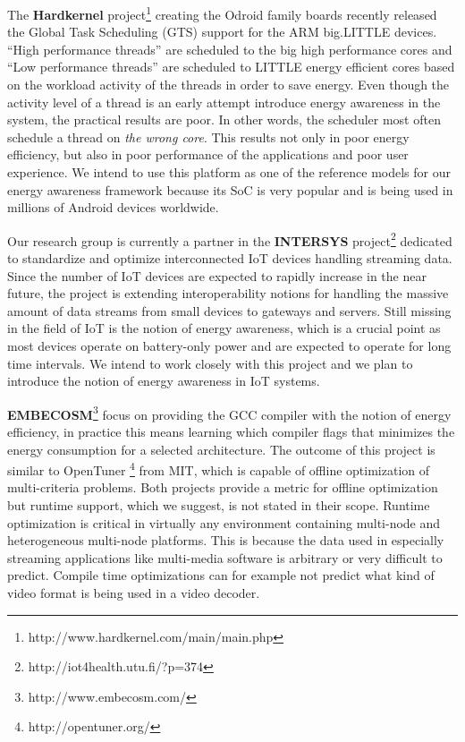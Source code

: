 \documentclass{article}
\begin{document}
The \textbf{Hardkernel} project\footnote{http://www.hardkernel.com/main/main.php} creating the Odroid family boards recently released the Global Task Scheduling (GTS) support for the ARM big.LITTLE devices. ``High performance threads'' are scheduled to the big high performance cores and ``Low performance threads'' are scheduled to LITTLE energy efficient cores based on the workload activity of the threads in order to save energy. 
Even though the activity level of a thread is an early attempt introduce energy awareness in the system, the practical results are poor. 
In other words, the scheduler most often schedule a thread on \textit{the wrong core}. 
This results not only in poor energy efficiency, but also in poor performance of the applications and poor user experience. 
We intend to use this platform as one of the reference models for our energy awareness framework because its SoC is very popular and is being used in millions of Android devices worldwide.\smallskip

Our research group is currently a partner in the \textbf{INTERSYS} project\footnote{http://iot4health.utu.fi/?p=374} dedicated to standardize and optimize interconnected IoT devices handling streaming data. Since the number of IoT devices are expected to rapidly increase in the near future, the project is extending interoperability notions for handling the massive amount of data streams from small devices to gateways and servers. 
Still missing in the field of IoT is the notion of energy awareness, which is a crucial point as most devices operate on battery-only power and are expected to operate for long time intervals. 
We intend to work closely with this project and we plan to introduce the notion of energy awareness in IoT systems.\smallskip

\textbf{EMBECOSM}\footnote{http://www.embecosm.com/} focus on providing the GCC compiler with the notion of energy efficiency, in practice this means learning which compiler flags that minimizes the energy consumption for a selected architecture. 
The outcome of this project is similar to OpenTuner \footnote{http://opentuner.org/} from MIT, which is capable of offline optimization of multi-criteria problems. 
Both projects provide a metric for offline optimization but runtime support, which we suggest, is not stated in their scope. 
Runtime optimization is critical in virtually any environment containing multi-node and heterogeneous multi-node platforms. 
This is because the data used in especially streaming applications like multi-media software is arbitrary or very difficult to predict. 
Compile time optimizations can for example not predict what kind of video format is being used in a video decoder.\smallskip
\end{document}
